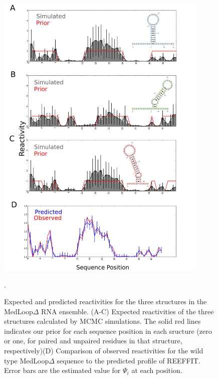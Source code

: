 \documentclass[12pt]{article}
\begin{document}
\begin{figure}[here]
\includegraphics[width=0.9\textwidth]{figures/medloopdeltapredicted.png}
\caption{Expected and predicted reactivities for the three structures in the MedLoop$\Delta$ RNA ensemble. (A-C) Expected reactivities of the three structures calculated by MCMC simulations. The solid red lines indicates our prior for each sequence position in each sructure (zero or one, for paired and unpaired residues in that structure, respectively)(D)  Comparison of observed reactivities for the wild type MedLoop$\Delta$ sequence to the predicted profile of REEFFIT. Error bars are the estimated value for $\Psi_i$ at each position.}.
\label{fig:medloopdeltapredictedfig}
\end{figure}
\end{document}
